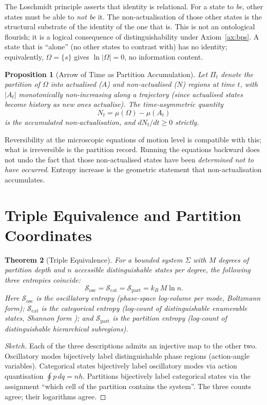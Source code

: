 \documentclass[11pt,a4paper]{article}
\newtheorem{theorem}{Theorem}[section]
\newtheorem{proposition}[theorem]{Proposition}
\theoremstyle{definition}
\theoremstyle{remark}
\newcommand{\Sk}{\mathcal{S}_{\mathrm{cat}}}
\newcommand{\St}{\mathcal{S}_{\mathrm{osc}}}
\newcommand{\Se}{\mathcal{S}_{\mathrm{part}}}
\newcommand{\kB}{k_{\scriptscriptstyle B}}
\begin{document}
The Loschmidt principle \citep{loschmidt1876} asserts that identity is relational. For a state to \emph{be}, other states must be able to \emph{not be} it. The non-actualisation of those other states is the structural substrate of the identity of the one that is. This is not an ontological flourish; it is a logical consequence of distinguishability under Axiom~\ref{ax:bps}. A state that is ``alone'' (no other states to contrast with) has no identity; equivalently, $\Omega = \{s\}$ gives $\ln|\Omega| = 0$, no information content.

\begin{proposition}[Arrow of Time as Partition Accumulation]
\label{prop:arrow}
Let $\Pi_t$ denote the partition of $\Omega$ into actualised ($A$) and non-actualised ($N$) regions at time $t$, with $|A_t|$ monotonically non-increasing along a trajectory (since actualised states become history as new ones actualise). The time-asymmetric quantity
\[
N_t = \mu(\Omega) - \mu(A_t)
\]
is the accumulated non-actualisation, and $dN_t/dt \ge 0$ strictly.
\end{proposition}

Reversibility at the microscopic equations of motion level is compatible with this; what is irreversible is the partition record. Running the equations backward does not undo the fact that those non-actualised states have been \emph{determined not to have occurred}. Entropy increase is the geometric statement that non-actualisation accumulates.

\section{Triple Equivalence and Partition Coordinates}
\label{sec:triple}

\begin{theorem}[Triple Equivalence]
\label{thm:triple}
For a bounded system $\Sigma$ with $M$ degrees of partition depth and $n$ accessible distinguishable states per degree, the following three entropies coincide:
\[
\St = \Sk = \Se = \kB\, M \ln n.
\]
Here $\St$ is the oscillatory entropy (phase-space log-volume per mode, Boltzmann form); $\Sk$ is the categorical entropy (log-count of distinguishable enumerable states, Shannon form \citep{shannon1948}); and $\Se$ is the partition entropy (log-count of distinguishable hierarchical subregions).
\end{theorem}

\begin{proof}[Sketch]
Each of the three descriptions admits an injective map to the other two. Oscillatory modes bijectively label distinguishable phase regions (action-angle variables). Categorical states bijectively label oscillatory modes via action quantisation $\oint p\,dq = nh$. Partitions bijectively label categorical states via the assignment ``which cell of the partition contains the system''. The three counts agree; their logarithms agree.
\end{proof}
\end{document}
